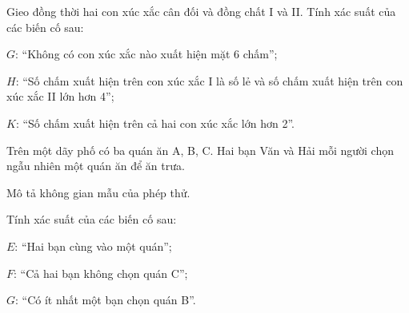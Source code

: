 \begin{exercises}
\begin{questions}[resume=SGK]
        \item Gieo đồng thời hai con xúc xắc cân đối và đồng chất I và II. Tính xác suất của các
        biến cố sau:

        $G$: “Không có con xúc xắc nào xuất hiện mặt 6 chấm”;

        \answerline
        \answerline

        $H$: “Số chấm xuất hiện trên con xúc xắc I là số lẻ và số chấm xuất hiện trên con
        xúc xắc II lớn hơn 4”;

        \answerline
        \answerline

        $K$: “Số chấm xuất hiện trên cả hai con xúc xắc lớn hơn 2”.

        \answerline
        \answerline

        \item Trên một dãy phố có ba quán ăn A, B, C. Hai bạn Văn và Hải mỗi người chọn ngẫu
        nhiên một quán ăn để ăn trưa.
        \begin{questions}
            \item Mô tả không gian mẫu của phép thử.

            \answerline
            \answerline

            \item Tính xác suất của các biến cố sau:

            $E$: “Hai bạn cùng vào một quán”;

            \answerline

            $F$: “Cả hai bạn không chọn quán C”;

            \answerline

            $G$: “Có ít nhất một bạn chọn quán B”.

            \answerline
        \end{questions}
    \end{questions}
\end{exercises}
